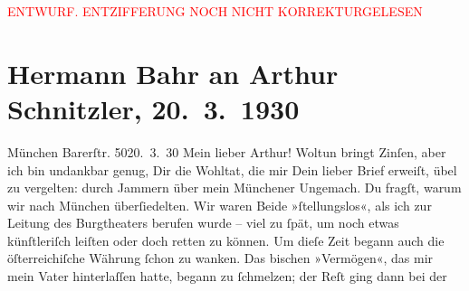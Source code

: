 
\begin{center}
            \textcolor{red}{ENTWURF. ENTZIFFERUNG NOCH NICHT KORREKTURGELESEN}
                      \end{center}
            
               \section[Hermann Bahr an Arthur Schnitzler, 20. 3. 1930]{ Hermann Bahr an Arthur Schnitzler, 20. 3. 1930}\nopagebreak{}\rehead{ }\begin{ledgroupsized}[t]{13cm}\normalsize\beginnumbering{} \toendnotes[C]{\smallbreak\pagebreak[2]} 
\toendnotes[C]{\smallbreak}\pstart
           \raggedleft{}{\pb}München Barerſtr. 5020. 3. 30\pend
           \pstart{}Mein lieber Arthur!\pend\pstart
           Woltun bringt Zinſen, aber ich bin undankbar genug, Dir die Wohltat, die mir Dein
               lieber Brief erweiſt, übel zu vergelten: durch Jammern über mein Münchener Ungemach. Du fragſt, warum wir nach München überſiedelten. Wir waren Beide »ſtellungslos«, als ich zur Leitung
               des Burgtheaters berufen wurde – viel zu ſpät, um
               noch etwas künſtleriſch leiſten oder doch retten zu können. Um dieſe Zeit begann auch
               die öſterreichiſche Währung ſchon zu wanken. Das
               bischen »Vermögen«, das mir mein Vater hinterlaſſen hatte, begann zu ſchmelzen; der Reſt ging dann bei der

\end{ledgroupsized}
